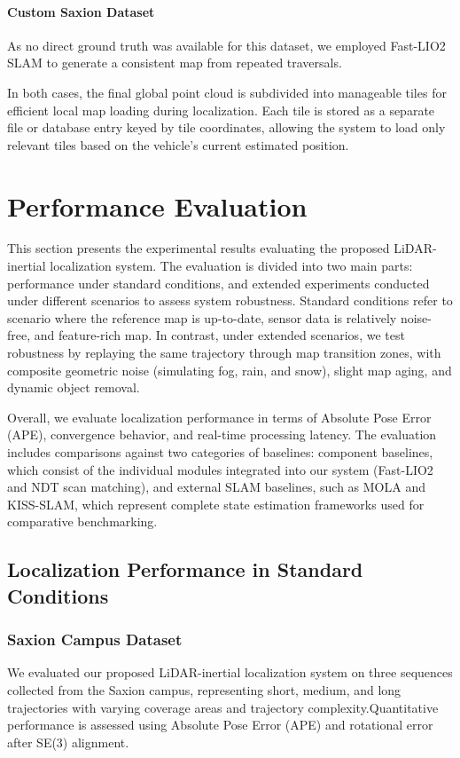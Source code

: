 \paragraph{Custom Saxion Dataset}
 As no direct ground truth was available for this dataset, we employed Fast-LIO2 SLAM to generate a consistent map from repeated traversals. 

In both cases, the final global point cloud is subdivided into manageable tiles for efficient local map loading during localization. Each tile is stored as a separate file or database entry keyed by tile coordinates, allowing the system to load only relevant tiles based on the vehicle’s current estimated position.


\section{Performance Evaluation}
This section presents the experimental results evaluating the proposed LiDAR-inertial localization system. The evaluation is divided into two main parts: performance under standard conditions, and extended experiments conducted under different scenarios to assess system robustness. Standard conditions refer to scenario where the reference map is up-to-date, sensor data is relatively noise-free, and feature-rich map. In contrast, under extended scenarios, we test robustness by replaying the same trajectory through map transition zones, with composite geometric noise (simulating fog, rain, and snow), slight map aging, and dynamic object removal.

Overall, we evaluate localization performance in terms of Absolute Pose Error (APE), convergence behavior, and real-time processing latency. The evaluation includes comparisons against two categories of baselines: component baselines, which consist of the individual modules integrated into our system (Fast-LIO2\cite{xuFastLIO2} and NDT\cite{biber2003ndt} scan matching), and external SLAM baselines, such as MOLA\cite{blanco2025mola_lo} and KISS-SLAM\cite{kiss2025arxiv}, which represent complete state estimation frameworks used for comparative benchmarking.

\subsection{ Localization Performance in Standard Conditions}

\subsubsection{Saxion Campus Dataset}
We evaluated our proposed LiDAR-inertial localization system on three sequences collected from the Saxion campus, representing short, medium, and long trajectories with varying coverage areas and trajectory complexity.Quantitative performance is assessed using Absolute Pose Error (APE) and rotational error after SE(3) alignment.

